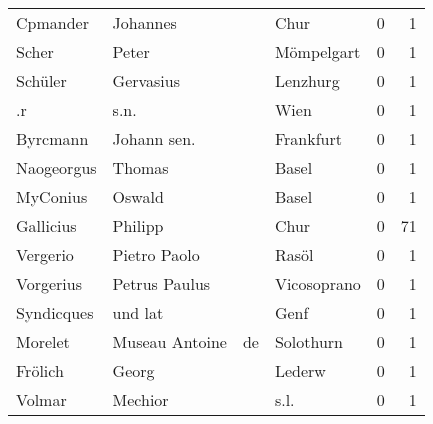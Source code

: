 \begin{center}
\begin{tiny}
\begin{longtabu}{llllrr}
                 Cpmander &                           Johannes &             &                                        Chur &          0 &         1 \\
                    Scher &                              Peter &             &                                  Mömpelgart &          0 &         1 \\
                  Schüler &                          Gervasius &             &                                    Lenzhurg &          0 &         1 \\
                       .r &                               s.n. &             &                                        Wien &          0 &         1 \\
                 Byrcmann &                        Johann sen. &             &                                   Frankfurt &          0 &         1 \\
               Naogeorgus &                             Thomas &             &                                       Basel &          0 &         1 \\
                 MyConius &                             Oswald &             &                                       Basel &          0 &         1 \\
                Gallicius &                            Philipp &             &                                        Chur &          0 &        71 \\
                 Vergerio &                       Pietro Paolo &             &                                       Rasöl &          0 &         1 \\
                Vorgerius &                      Petrus Paulus &             &                                 Vicosoprano &          0 &         1 \\
               Syndicques &                            und lat &             &                                        Genf &          0 &         1 \\
                  Morelet &                     Museau Antoine &          de &                                   Solothurn &          0 &         1 \\
                  Frölich &                              Georg &             &                                      Lederw &          0 &         1 \\
                   Volmar &                            Mechior &             &                                        s.l. &          0 &         1 \\

\end{longtabu}
\end{tiny}
\end{center}
